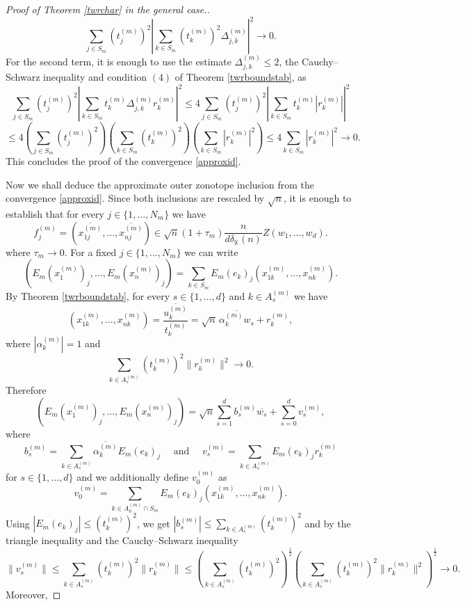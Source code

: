 \documentclass[12pt, reqno]{amsart}
\theoremstyle{definition}
\theoremstyle{remark}
\numberwithin{equation}{section}
\begin{document}
\begin{proof}[Proof of Theorem \ref{twrchar} in the general case.]
$$\sum_{j \in S_m} (t^{(m)}_j)^2 \left | \sum_{k \in S_m} (t^{(m)}_k)^2 \Delta^{(m)}_{j, k} \right |^2 \to 0. $$
For the second term, it is enough to use the estimate $\Delta^{(m)}_{j, k} \leq 2$, the Cauchy--Schwarz inequality and condition $(4)$ of Theorem \ref{twrboundstab}, as
$$\sum_{j \in S_m} (t^{(m)}_j)^2 \left | \sum_{k \in S_m} t^{(m)}_k \Delta^{(m)}_{j, k}r^{(m)}_k \right |^2 \leq 4\sum_{j \in S_m} (t^{(m)}_j)^2 \left | \sum_{k \in S_m} t^{(m)}_k |r^{(m)}_k| \right |^2$$
$$\leq 4 \left ( \sum_{j \in S_m} (t^{(m)}_j)^2 \right ) \left ( \sum_{k \in S_m} (t_k^{(m)})^2 \right ) \left ( \sum_{k \in S_m} |r^{(m)}_k|^2 \right ) \leq 4 \sum_{k \in S_m} |r^{(m)}_k|^2 \to 0.$$
This concludes the proof of the convergence \eqref{approxid}.


Now we shall deduce the approximate outer zonotope inclusion from the convergence \eqref{approxid}. Since both inclusions are rescaled by $\sqrt n$, it is enough to establish that for every $j \in \{1, \ldots, N_m\}$ we have
$$f^{(m)}_j = \left ( \overline{x^{(m)}_{1j}}, \ldots, \overline{x^{(m)}_{nj}} \right ) \in \sqrt{n}(1+\tau_m) \frac{n}{d\delta_{\mathbb{K}}(n)} Z(w_1, \ldots, w_d).$$
where $\tau_m \to 0$. For a fixed $j \in \{1, \ldots, N_m\}$ we can write
$$(E_m(x_1^{(m)})_{j},\ldots,E_m(x_n^{(m)})_{j}) = \sum_{k \in S_m} E_m(e_k)_{j} (x_{1k}^{(m)},\dots,x_{nk}^{(m)}).$$
By Theorem \eqref{twrboundstab}, for every $s \in \{1, \ldots, d\}$ and $k \in A_s^{(m)}$ we have 
\[ (x_{1k}^{(m)},\dots,x_{nk}^{(m)}) = \frac{\overline{u_k^{(m)}}}{t_k^{(m)}} = \sqrt n\, \overline{\alpha_k^{(m)} w_s} + r_k^{(m)}, \] 
where $|\alpha_k^{(m)}|=1$ and 
\[ \sum_{k\in A_s^{(m)}} (t_k^{(m)})^2 \|r_k^{(m)}\|^2 \to 0. \] 
Therefore 
\[ (E_m(x_1^{(m)})_{j},\dots,E_m(x_n^{(m)})_{j}) = \sqrt n \sum_{s=1}^{d} b_s^{(m)} \overline{w_s} + \sum_{s=0}^{d} v^{(m)}_s, \] where 
\[ b_s^{(m)} = \sum_{k\in A_s^{(m)}} \overline{\alpha_k^{(m)}} E_m(e_k)_{j} \quad \text{ and } \quad v^{(m)}_s = \sum_{k\in A_s^{(m)}} E_m(e_k)_{j} r_k^{(m)}\]
for $s \in \{1, \ldots, d\}$ and we additionally define $v_0^{(m)}$ as
$$v_0^{(m)} = \sum_{k \in A_0^{(m)} \cap S_m} E_m(e_k)_{j} ( x_{1k}^{(m)}, \dots, x_{nk}^{(m)} ).$$
Using $|E_m(e_k)_{j}| \le (t_k^{(m)})^2$, we get 
$|b_s^{(m)}| \le \sum_{k\in A_s^{(m)}} (t_k^{(m)})^2$
and by the triangle inequality and the Cauchy--Schwarz inequality
$$\|v^{(m)}_s\| \leq \sum_{k\in A_s^{(m)}} (t_k^{(m)})^2 \|r_k^{(m)}\| \leq \left ( \sum_{k\in A_s^{(m)}} (t_k^{(m)})^2 \right )^{\frac{1}{2}} \left ( \sum_{k\in A_s^{(m)}} (t_k^{(m)})^2 \|r_k^{(m)}\|^2 \right )^{\frac{1}{2}} \to 0.$$
Moreover,

\end{proof}
\end{document}
